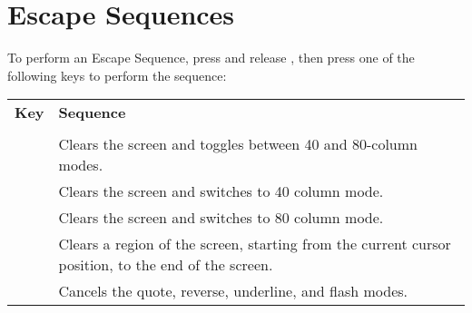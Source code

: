 \section{Escape Sequences}
\label{escape-sequences}
To perform an Escape Sequence, press and release ,
then press one of the following keys to perform the sequence:

\begin{center}
\begin{longtable}{c|L{5.5cm}}
	\textbf{Key} & \textbf{Sequence}\\
  \hhline{==}
	\endhead

   \\
  \hhline{==}

  &
Clears the screen and toggles between 40 and 80-column modes.\\
\hline

  &
Clears the screen and switches to 40 column mode.\\
\hline

  &
Clears the screen and switches to 80 column mode.\\
\hline

  &
Clears a region of the screen, starting from the current cursor position, to the end of the screen.\\
\hline

  &
Cancels the quote, reverse, underline, and flash modes.\\


\end{longtable}
\end{center}
